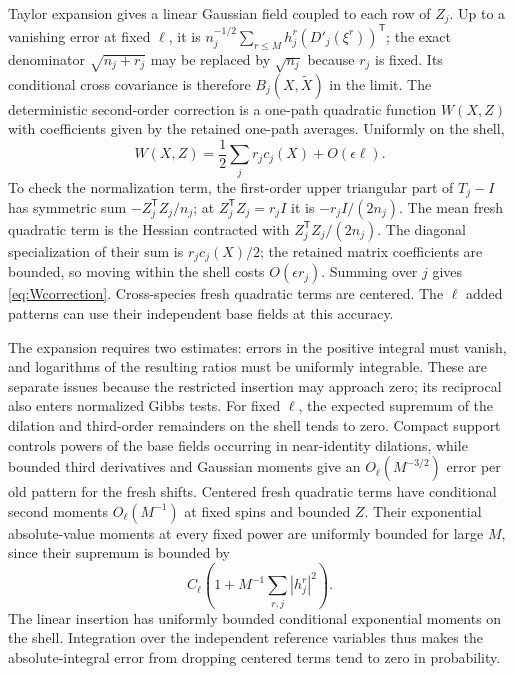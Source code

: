 \documentclass[11pt]{article}
\numberwithin{equation}{section}
\theoremstyle{definition}
\begin{document}
Taylor expansion gives a linear Gaussian field coupled to each row of $Z_j$. Up to a vanishing error at fixed $\ell$, it is
$n_j^{-1/2}\sum_{r\le M}h_j^r(D'_j(\xi^r))^{\mathsf T}$;
the exact denominator $\sqrt{n_j+r_j}$ may be replaced by $\sqrt{n_j}$ because $r_j$ is fixed. Its conditional cross covariance is therefore $B_j(X,\widetilde X)$ in the limit.
The deterministic second-order correction is a one-path quadratic function $W(X,Z)$ with coefficients given by the retained one-path averages. Uniformly on the shell,
\begin{equation}\label{eq:Wcorrection}
W(X,Z)=\frac12\sum_jr_jc_j(X)+O(\epsilon\ell).
\end{equation}
To check the normalization term, the first-order upper triangular part of $T_j-I$ has symmetric sum $-Z_j^{\mathsf T}Z_j/n_j$; at $Z_j^{\mathsf T}Z_j=r_jI$ it is $-r_jI/(2n_j)$. The mean fresh quadratic term is the Hessian contracted with $Z_j^{\mathsf T}Z_j/(2n_j)$. The diagonal specialization of their sum is $r_jc_j(X)/2$; the retained matrix coefficients are bounded, so moving within the shell costs $O(\epsilon r_j)$. Summing over $j$ gives \eqref{eq:Wcorrection}. Cross-species fresh quadratic terms are centered. The $\ell$ added patterns can use their independent base fields at this accuracy.

The expansion requires two estimates: errors in the positive integral must vanish, and logarithms of the resulting ratios must be uniformly integrable. These are separate issues because the restricted insertion may approach zero; its reciprocal also enters normalized Gibbs tests. For fixed $\ell$, the expected supremum of the dilation and third-order remainders on the shell tends to zero. Compact support controls powers of the base fields occurring in near-identity dilations, while bounded third derivatives and Gaussian moments give an $O_\ell(M^{-3/2})$ error per old pattern for the fresh shifts. Centered fresh quadratic terms have conditional second moments $O_\ell(M^{-1})$ at fixed spins and bounded $Z$. Their exponential absolute-value moments at every fixed power are uniformly bounded for large $M$, since their supremum is bounded by
\[
C_\ell\left(1+M^{-1}\sum_{r,j}|h_j^r|^2\right).
\]
The linear insertion has uniformly bounded conditional exponential moments on the shell. Integration over the independent reference variables thus makes the absolute-integral error from dropping centered terms tend to zero in probability.
\end{document}

